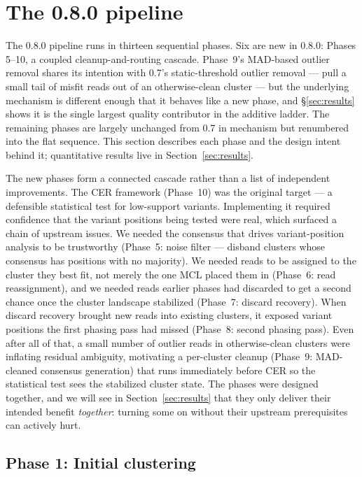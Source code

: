 \documentclass[11pt]{article}
\begin{document}
\section{The 0.8.0 pipeline}
\label{sec:pipeline-08}

The 0.8.0 pipeline runs in thirteen sequential phases. Six are new in
0.8.0: Phases 5--10, a coupled cleanup-and-routing cascade. Phase~9's
MAD-based outlier removal shares its intention with 0.7's
static-threshold outlier removal --- pull a small tail of misfit reads
out of an otherwise-clean cluster --- but the underlying mechanism is
different enough that it behaves like a new phase, and
§\ref{sec:results} shows it is the single largest quality contributor
in the additive ladder. The remaining phases are largely unchanged
from 0.7 in mechanism but renumbered into the flat sequence. This
section describes each phase and the design intent behind it;
quantitative results live in Section~\ref{sec:results}.

The new phases form a connected cascade rather than a list of independent
improvements. The CER framework (Phase~10) was the original target --- a
defensible statistical test for low-support variants. Implementing it required
confidence that the variant positions being tested were real, which surfaced a
chain of upstream issues. We needed the consensus that drives variant-position
analysis to be trustworthy (Phase~5: noise filter --- disband clusters whose
consensus has positions with no majority). We needed reads to be assigned to
the cluster they best fit, not merely the one MCL placed them in (Phase~6:
read reassignment), and we needed reads earlier phases had discarded to get a
second chance once the cluster landscape stabilized (Phase~7: discard
recovery). When discard recovery brought new reads into existing clusters, it
exposed variant positions the first phasing pass had missed (Phase~8: second
phasing pass). Even after all of that, a small number of outlier reads in
otherwise-clean clusters were inflating residual ambiguity, motivating a
per-cluster cleanup (Phase~9: MAD-cleaned consensus generation) that
runs immediately before CER so the statistical test sees the
stabilized cluster state.
The phases were designed together, and we will see in
Section~\ref{sec:results} that they only deliver their intended
benefit \emph{together}: turning some on without their upstream
prerequisites can actively hurt.

\subsection*{Phase 1: Initial clustering}
\end{document}

